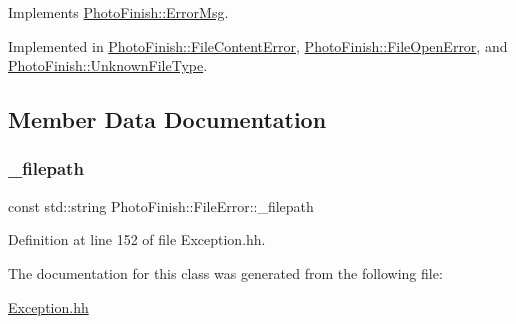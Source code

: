 Implements \hyperlink{class_photo_finish_1_1_error_msg_ae84614a0c68520a7ad11e699c1504e82}{Photo\+Finish\+::\+Error\+Msg}.



Implemented in \hyperlink{class_photo_finish_1_1_file_content_error_a20d98434ca93caa0350503e224d8675e}{Photo\+Finish\+::\+File\+Content\+Error}, \hyperlink{class_photo_finish_1_1_file_open_error_ab88924bbaf53b4ba6efda71d7a4d4baf}{Photo\+Finish\+::\+File\+Open\+Error}, and \hyperlink{class_photo_finish_1_1_unknown_file_type_a756a01080a750ff0c5bb6fa81e9a6b2a}{Photo\+Finish\+::\+Unknown\+File\+Type}.



\subsection{Member Data Documentation}
\mbox{\label{class_photo_finish_1_1_file_error_a15b57c5056cbcb44ae2a8338cb9b4c08}} 
\subsubsection{\texorpdfstring{\+\_\+filepath}{\_filepath}}
{\footnotesize\ttfamily const std\+::string Photo\+Finish\+::\+File\+Error\+::\+\_\+filepath\hspace{0.3cm}{\ttfamily [protected]}}



Definition at line 152 of file Exception.\+hh.



The documentation for this class was generated from the following file\+:\begin{DoxyCompactItemize}
\item 
\hyperlink{_exception_8hh}{Exception.\+hh}\end{DoxyCompactItemize}
